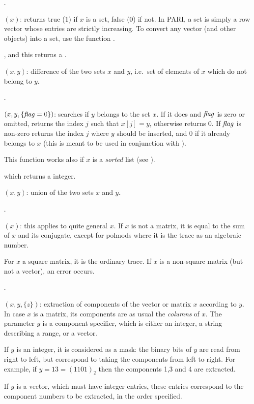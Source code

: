 .

$(x)$: returns true (1) if $x$ is a set, false (0) if
not. In PARI, a set is simply a row vector whose entries are strictly
increasing. To convert any vector (and other objects) into a set, use the
function .

, and this returns a .

$(x,y)$: difference of the two sets $x$ and $y$,
i.e.~set of elements of $x$ which do not belong to $y$.

.

$(x,y,\{\hbox{\it f\kern0pt lag\/}=0\})$: searches if $y$ belongs to the set
$x$. If it does and $\hbox{\it f\kern0pt lag\/}$ is zero or omitted, returns the index $j$ such that
$x[j]=y$, otherwise returns 0. If $\hbox{\it f\kern0pt lag\/}$ is non-zero returns the index $j$
where $y$ should be inserted, and $0$ if it already belongs to $x$ (this is
meant to be used in conjunction with ).

This function works also if $x$ is a \emph{sorted} list (see ).

 which returns a 
integer.

$(x,y)$: union of the two sets $x$ and $y$.

.

$(x)$: this applies to quite general $x$. If $x$ is not a
matrix, it is equal to the sum of $x$ and its conjugate, except for polmods
where it is the trace as an algebraic number.

For $x$ a square matrix, it is the ordinary trace. If $x$ is a
non-square matrix (but not a vector), an error occurs.

.

$(x,y,\{z\})$: extraction of components of the
vector or matrix $x$ according to $y$. In case $x$ is a matrix, its
components are as usual the \emph{columns} of $x$. The parameter $y$ is a
component specifier, which is either an integer, a string describing a
range, or a vector.

If $y$ is an integer, it is considered as a mask: the binary bits of $y$ are
read from right to left, but correspond to taking the components from left to
right. For example, if $y=13=(1101)_2$ then the components 1,3 and 4 are
extracted.

If $y$ is a vector, which must have integer entries, these entries correspond
to the component numbers to be extracted, in the order specified.

